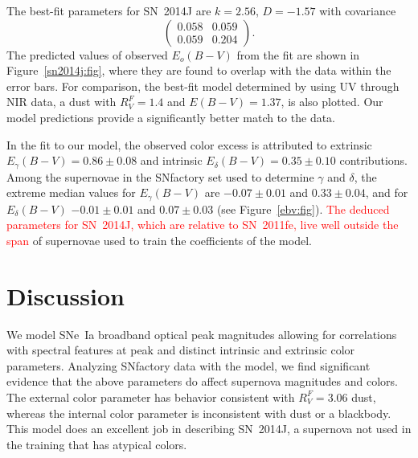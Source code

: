 \documentclass{aastex}   	%
\begin{document}
The best-fit parameters for SN~2014J are $k= 2.56$, $ D=-1.57$ with covariance
\begin{equation}
\begin{pmatrix}
0.058 & 0.059 \\
0.059 & 0.204
\end{pmatrix}.
\end{equation}
The predicted values of observed $E_o(B-V)$ from the fit are shown in Figure~\ref{sn2014j:fig}, where they are found to
overlap with the data within the error bars.   For comparison, the best-fit model determined by  \citet{2014ApJ...788L..21A} using
UV through NIR data,
a  \citet{1999PASP..111...63F} dust with $R_V^F=1.4$ and $E(B-V)=1.37$, 
is also plotted.  Our model predictions provide a significantly better match to the data.

In the fit to our model, the observed color excess is attributed to   extrinsic
$E_\gamma(B-V)=  0.86 \pm   0.08$ and intrinsic $E_\delta(B-V)=  0.35 \pm   0.10$ contributions.
Among the supernovae in the SNfactory  set used to determine $\gamma$ and $\delta$, the
\color{red}
extreme median values for 
$E_\gamma(B-V)$ are $-0.07 \pm 0.01$ and  $  0.33 \pm 0.04$,
and for $E_\delta(B-V)$ $-0.01 \pm 0.01$  and
$  0.07 \pm 0.03$ 
\color{black}
(see Figure~\ref{ebv:fig}).
\textcolor{red}{The deduced parameters for SN~2014J, which are relative to SN~2011fe, live well outside the 
span} of supernovae used to train the coefficients of the model.

\section{Discussion}
\label{discussion:sec}
We model SNe~Ia broadband optical peak magnitudes allowing for correlations with spectral features at peak and distinct intrinsic and
extrinsic color parameters.  Analyzing SNfactory data with the model, we find significant evidence that the above parameters do
affect supernova magnitudes and colors.  The external color parameter has behavior consistent with $R^F_V=3.06$ \citet{1999PASP..111...63F} dust,
whereas the internal color parameter is inconsistent with dust or a blackbody.  This model  does an excellent job in
describing SN~2014J, a supernova not used in the training that has atypical colors.
\end{document}
